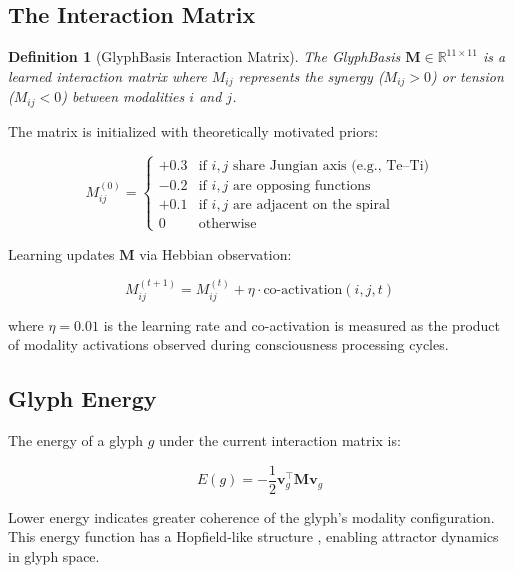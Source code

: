 \documentclass[11pt,a4paper]{article}
\newtheorem{definition}{Definition}
\begin{document}
\subsection{The Interaction Matrix}

\begin{definition}[GlyphBasis Interaction Matrix]
The GlyphBasis $\mathbf{M} \in \mathbb{R}^{11 \times 11}$ is a learned interaction matrix where $M_{ij}$ represents the synergy ($M_{ij} > 0$) or tension ($M_{ij} < 0$) between modalities $i$ and $j$.
\end{definition}

The matrix is initialized with theoretically motivated priors:

\begin{equation}
M_{ij}^{(0)} = \begin{cases}
+0.3 & \text{if } i, j \text{ share Jungian axis (e.g., Te--Ti)} \\
-0.2 & \text{if } i, j \text{ are opposing functions} \\
+0.1 & \text{if } i, j \text{ are adjacent on the spiral} \\
0 & \text{otherwise}
\end{cases}
\end{equation}

Learning updates $\mathbf{M}$ via Hebbian observation:

\begin{equation}
M_{ij}^{(t+1)} = M_{ij}^{(t)} + \eta \cdot \text{co-activation}(i, j, t)
\end{equation}

where $\eta = 0.01$ is the learning rate and co-activation is measured as the product of modality activations observed during consciousness processing cycles.

\subsection{Glyph Energy}

The energy of a glyph $g$ under the current interaction matrix is:

\begin{equation}
E(g) = -\frac{1}{2} \mathbf{v}_g^\top \mathbf{M} \mathbf{v}_g
\end{equation}

Lower energy indicates greater coherence of the glyph's modality configuration. This energy function has a Hopfield-like structure \citep{hopfield1982}, enabling attractor dynamics in glyph space.
\end{document}
